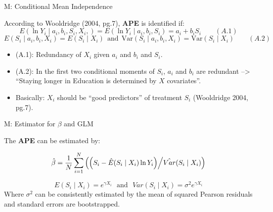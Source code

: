 \documentclass[10pt,ignorenonframetext,]{beamer}
\providecommand{\tightlist}{%
  \setlength{\itemsep}{0pt}\setlength{\parskip}{0pt}}
\begin{document}
\begin{frame}{M: Conditional Mean Independence}
\protect\hypertarget{m-conditional-mean-independence}{}

According to Wooldridge (2004, pg.7), \textbf{APE} is identified if:
\[E (\ln Y_i \mid a_i, b_i, S_i, X_i,) = E (\ln Y_i \mid a_i, b_i, S_i) = a_i+b_i S_i \qquad (A.1)\]
\[E(S_i \mid a_i, b_i, X_i) = E(S_i \mid X_i) ~~\text{and}~~ \mathrm{Var}(S_i \mid 
a_i, b_i, X_i) = \mathrm{Var} (S_i \mid X_i) \qquad (A.2)\]

\begin{itemize}
\tightlist
\item
  (A.1): Redundancy of \(X_i\) given \(a_i\) and \(b_i\) and \(S_i\).
\item
  (A.2): In the first two conditional moments of \(S_i\), \(a_i\) and
  \(b_i\) are redundant --\textgreater{} ``Staying longer in Education
  is determined by \(X\) covariates''.
\item
  Basically: \(X_i\) should be ``good predictors'' of treatment \(S_i\)
  (Wooldridge 2004, pg.7).
\end{itemize}

\end{frame}

\begin{frame}{M: Estimator for \(\beta\) and GLM}
\protect\hypertarget{m-estimator-for-beta-and-glm}{}

The \textbf{APE} can be estimated by:

\[\hat \beta = \frac{1}{N} \sum_{i=1}^N \left( \left( S_i - \hat E (S_i \mid X_i) \ln Y_i \right) \middle/
\hat{Var}(S_i \mid X_i)\right)\]

\[E(S_i \mid X_i ) = e^{\gamma X_i}  ~~~\text{and}~~~ Var(S_i \mid X_i ) = \sigma^2e^{\gamma X_i}\]
Where \(\sigma^2\) can be consistently estimated by the mean of squared
Pearson residuals and standard errors are bootstrapped.

\end{frame}
\end{document}
